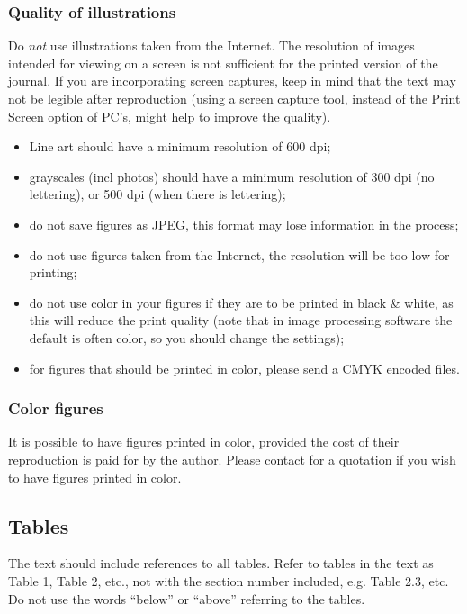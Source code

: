 \documentclass[bsi]{iosart2x}
\begin{document}
\subsubsection{Quality of illustrations}\label{s3.8.2}
Do \textit{not} use illustrations taken from the Internet.
The resolution of images intended for viewing on a screen is not sufficient for the printed version of the journal.
If you are incorporating screen captures, keep in mind that the text may not be legible after reproduction
(using a screen capture tool, instead of the Print Screen option of PC's, might help to improve the quality).


\begin{itemize}
\item Line art should have a minimum resolution of 600 dpi;
\item  grayscales (incl photos) should have a minimum resolution of 300 dpi (no lettering), or 500 dpi (when there is lettering);
\item  do not save figures as JPEG, this format may lose information in the
process;
\item  do not use figures taken from the Internet, the resolution will be too low for
printing;
\item  do not use color in your figures if they are to be printed in black \& white, as this will reduce the print
quality (note that in image processing software the default is often color, so you should change the
settings);
\item  for figures that should be printed in color, please send a CMYK encoded files.
\end{itemize}

\subsubsection{Color figures}
It is possible to have figures printed in color,
provided the cost of their reproduction is paid for by the author.
Please contact  for a quotation if you wish to have figures printed in color.

\subsection{Tables}

The text should include references to all tables.
Refer to tables in the text as Table 1, Table 2, etc., not with the section number included,
 e.g. Table 2.3, etc. Do not use the words ``below'' or ``above'' referring to the
 tables.
\end{document}
